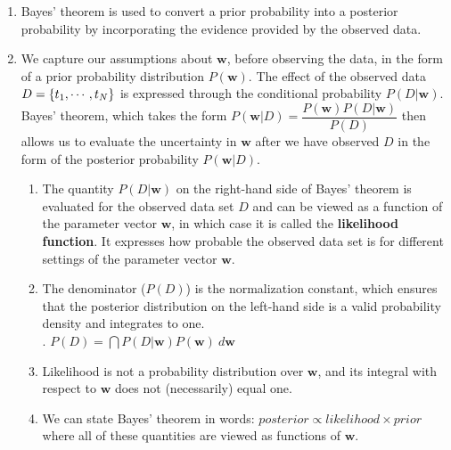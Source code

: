 \begin{enumerate}
    \item Bayes' theorem is used to convert a prior probability into a posterior probability by incorporating the evidence provided by the observed data.
    \hfill \cite{ml/book/Pattern-Recognition-And-Machine-Learning/Christopher-M-Bishop}

    \item We capture our assumptions about $\bm{w}$, before observing the data, in the form of a prior probability distribution $P(\bm{w})$.
    The effect of the observed data $D = \left\{t_1, \cdots , t_N \right\}$ is expressed through the conditional probability $P(D|\bm{w})$.
    Bayes’ theorem, which takes the form
    $
        P(\bm{w}|D) = \dfrac{P(\bm{w})P(D|\bm{w})}{P(D)}
    $
    then allows us to evaluate the uncertainty in $\bm{w}$ after we have observed $D$ in the form of the posterior probability $P(\bm{w}|D)$.
    \hfill \cite{ml/book/Pattern-Recognition-And-Machine-Learning/Christopher-M-Bishop}
    \begin{enumerate}
        \item The quantity $P(D|\bm{w})$ on the right-hand side of Bayes' theorem is evaluated for the observed data set $D$ and can be viewed as a function of the parameter vector $\bm{w}$, in which case it is called the \textbf{likelihood function}.
        It expresses how probable the observed data set is for different settings of the parameter vector $\bm{w}$.
        \hfill \cite{ml/book/Pattern-Recognition-And-Machine-Learning/Christopher-M-Bishop}

        \item The denominator ($P(D)$) is the normalization constant, which ensures that the posterior distribution on the left-hand side is a valid probability density and integrates to one.
        \hfill \cite{ml/book/Pattern-Recognition-And-Machine-Learning/Christopher-M-Bishop}
        \\
        .\hfill
        $
            P(D) = \dint P(D|\bm{w})P(\bm{w})\ d\bm{w}
        $
        \hfill \cite{ml/book/Pattern-Recognition-And-Machine-Learning/Christopher-M-Bishop}

        \item Likelihood is not a probability distribution over $\bm{w}$, and its integral with respect to $\bm{w}$ does not (necessarily) equal one.
        \hfill \cite{ml/book/Pattern-Recognition-And-Machine-Learning/Christopher-M-Bishop}

        \item We can state Bayes’ theorem in words:
        $
            posterior \propto likelihood \times prior
        $
        where all of these quantities are viewed as functions of $\bm{w}$.
        \hfill \cite{ml/book/Pattern-Recognition-And-Machine-Learning/Christopher-M-Bishop}
    \end{enumerate}


\end{enumerate}
